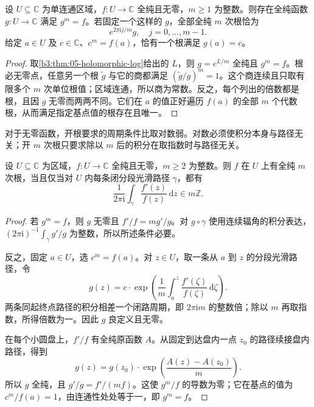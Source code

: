 \begin{corollary}[全纯根]\label{b3:cor:05-holomorphic-root}
设 \(U\subseteq\mathbb C\) 为单连通区域，\(f:U\to\mathbb C\) 全纯且无零，\(m\ge1\) 为整数。则存在全纯函数 \(g:U\to\mathbb C\) 满足 \(g^m=f\)。若固定一个这样的 \(g\)，全部全纯 \(m\) 次根恰为
\[
 e^{2\pi\mathrm{i}j/m}g,\quad j=0,\ldots,m-1.
\]
给定 \(a\in U\) 及 \(c\in\mathbb C\)、\(c^m=f(a)\)，恰有一个根满足 \(g(a)=c\)。
\end{corollary}
\begin{proof}
取\cref{b3:thm:05-holomorphic-log}给出的 \(L\)，则 \(g=e^{L/m}\) 全纯且 \(g^m=f\)。根必无零点，任意另一个根 \(\widetilde g\) 与它的商都满足 \((\widetilde g/g)^m=1\)。这个商连续且只取有限多个 \(m\) 次单位根值；区域连通，所以商为常数。反之，每个列出的倍数都是根，且因 \(g\) 无零而两两不同。它们在 \(a\) 的值正好遍历 \(f(a)\) 的全部 \(m\) 个代数根，从而满足指定基点值的根存在且唯一。
\end{proof}

对于无零函数，开根要求的周期条件比取对数弱。对数必须使积分本身与路径无关；开 \(m\) 次根只要求除以 \(m\) 后的积分在取指数时与路径无关。

\begin{proposition}[无零全纯根的周期判别]\label{b3:prop:05-root-periods}
设 \(U\subseteq\mathbb C\) 为区域，\(f:U\to\mathbb C\) 全纯且无零，\(m\ge2\) 为整数。则 \(f\) 在 \(U\) 上有全纯 \(m\) 次根，当且仅当对 \(U\) 内每条闭分段光滑路径 \(\gamma\)，都有
\[
 \frac1{2\pi\mathrm{i}}\int_\gamma\frac{f'(z)}{f(z)}\,\mathrm{d}z
 \in m\mathbb Z.
\]
\end{proposition}
\begin{proof}
若 \(g^m=f\)，则 \(g\) 无零且 \(f'/f=m g'/g\)。对 \(g\circ\gamma\) 使用连续辐角的积分表达，\((2\pi\mathrm{i})^{-1}\int_\gamma g'/g\) 为整数，所以所述条件必要。

反之，固定 \(a\in U\)，选 \(c^m=f(a)\)。对 \(z\in U\)，取一条从 \(a\) 到 \(z\) 的分段光滑路径，令
\[
 g(z)=c\cdot\exp\left(\frac1m\int_a^z\frac{f'(\zeta)}{f(\zeta)}\,\mathrm{d}\zeta\right).
\]
两条同起终点路径的积分相差一个闭路周期，即 \(2\pi\mathrm{i}m\) 的整数倍；除以 \(m\) 再取指数，所得倍数为一。因此 \(g\) 良定义且无零。

在每个小圆盘上，\(f'/f\) 有全纯原函数 \(A\)。从固定到达盘内一点 \(z_0\) 的路径续接盘内路径，得到
\[
 g(z)=g(z_0)\cdot\exp\left(\frac{A(z)-A(z_0)}m\right).
\]
所以 \(g\) 全纯，且 \(g'/g=f'/(mf)\)。这使 \(g^m/f\) 的导数为零；它在基点的值为 \(c^m/f(a)=1\)，由连通性处处等于一，即 \(g^m=f\)。
\end{proof}

